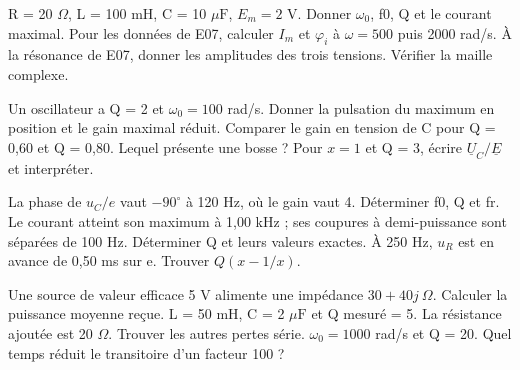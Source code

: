 R = 20 $\Omega$, L = 100 mH, C = 10 $\mu\mathrm F$, $E_m=2$ V. Donner $\omega_0$, f0, Q et le courant maximal.
Pour les données de E07, calculer $I_m$ et $\varphi_i$ à $\omega=500$ puis 2000 rad/s.
À la résonance de E07, donner les amplitudes des trois tensions. Vérifier la maille complexe.


Un oscillateur a Q = 2 et $\omega_0=100$ rad/s. Donner la pulsation du maximum en position et le gain maximal réduit.
Comparer le gain en tension de C pour Q = 0,60 et Q = 0,80. Lequel présente une bosse ?
Pour $x=1$ et Q = 3, écrire $\underline U_C/\underline E$ et interpréter.


La phase de $u_C/e$ vaut $-90^\circ$ à 120 Hz, où le gain vaut 4. Déterminer f0, Q et fr.
Le courant atteint son maximum à 1,00 kHz ; ses coupures à demi-puissance sont séparées de 100 Hz. Déterminer Q et leurs valeurs exactes.
À 250 Hz, $u_R$ est en avance de 0,50 ms sur e. Trouver $Q(x-1/x)$.


Une source de valeur efficace 5 V alimente une impédance $30+40j\ \Omega$. Calculer la puissance moyenne reçue.
L = 50 mH, C = 2 $\mu\mathrm F$ et Q mesuré = 5. La résistance ajoutée est 20 $\Omega$. Trouver les autres pertes série.
$\omega_0=1000$ rad/s et Q = 20. Quel temps réduit le transitoire d’un facteur 100 ?


